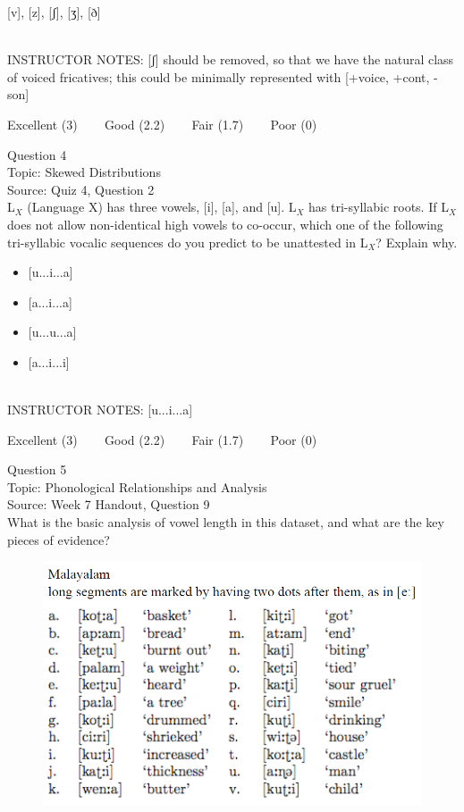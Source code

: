\documentclass[12pt]{article}
\begin{document}
{[v]}, {[z]}, {[ʃ]}, {[ʒ]}, {[ð]}


~\\
INSTRUCTOR NOTES: [ʃ] should be removed, so that we have the natural class of voiced fricatives; this could be minimally represented with [+voice, +cont, -son]


\vfill
Excellent (3) ~~~ Good (2.2) ~~~ Fair (1.7) ~~~ Poor (0)
\newpage

{\large Question 4}\\

Topic: Skewed Distributions\\
Source: Quiz 4, Question 2\\

L$_X$ (Language X) has three vowels, [i], [a], and [u]. L$_X$ has tri-syllabic roots. If L$_X$ does not allow non-identical high vowels to co-occur, which one of the following tri-syllabic vocalic sequences do you predict to be unattested in L$_X$? Explain why.\\

\begin{itemize} \item {[u...i...a]} \item {[a...i...a]} \item {[u...u...a]} \item {[a...i...i]} \end{itemize}


~\\
INSTRUCTOR NOTES: [u...i...a]


\vfill
Excellent (3) ~~~ Good (2.2) ~~~ Fair (1.7) ~~~ Poor (0)
\newpage

{\large Question 5}\\

Topic: Phonological Relationships and Analysis\\
Source: Week 7 Handout, Question 9\\

What is the basic analysis of vowel length in this dataset, and what are the key pieces of evidence?\\

\begin{figure}[H]
\includegraphics{../images/malayalam.png}
\end{figure}
\end{document}
